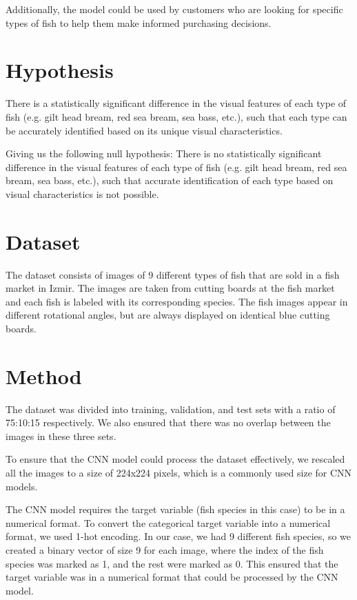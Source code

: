 \documentclass[a4paper, twocolumn]{article}
\begin{document}
Additionally, the model could be used by customers who are looking for specific types of fish to help them make informed purchasing decisions.


\section{Hypothesis\label{sec:Hypothesis}}

There is a statistically significant difference in the visual features of each type of fish (e.g. gilt head bream, red sea bream, sea bass, etc.), such that each type can be accurately identified based on its unique visual characteristics.

Giving us the following null hypothesis:
There is no statistically significant difference in the visual features of each type of fish (e.g. gilt head bream, red sea bream, sea bass, etc.), such that accurate identification of each type based on visual characteristics is not possible.

\section{Dataset\label{sec:Dataset}}
The dataset consists of images of 9 different types of fish that are sold in a fish market in Izmir. The images are taken from cutting boards at the fish market and each fish is labeled with its corresponding species. The fish images appear in different rotational angles, but are always displayed on identical blue cutting boards. \cite{ulucan2020large}

\section{Method}\label{sec: Method}
 The dataset was divided into training, validation, and test sets with a ratio of 75:10:15 respectively. We also ensured that there was no overlap between the images in these three sets.
 
To ensure that the CNN model could process the dataset effectively, we rescaled all the images to a size of 224x224 pixels, which is a commonly used size for CNN models.
\cite{Talebi_2021_ICCV}

The CNN model requires the target variable (fish species in this case) to be in a numerical format. To convert the categorical target variable into a numerical format, we used 1-hot encoding. In our case, we had 9 different fish species, so we created a binary vector of size 9 for each image, where the index of the fish species was marked as 1, and the rest were marked as 0. This ensured that the target variable was in a numerical format that could be processed by the CNN model.
\end{document}

